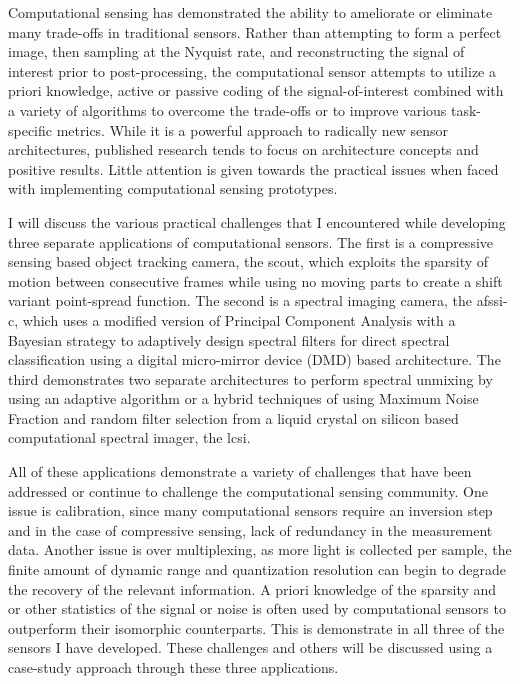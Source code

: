 Computational sensing has demonstrated the ability to ameliorate or eliminate many trade-offs in traditional sensors. Rather than attempting to form a perfect image, then sampling at the Nyquist rate, and reconstructing the signal of interest prior to post-processing, the computational sensor attempts to utilize a priori knowledge, active or passive coding of the signal-of-interest combined with a variety of algorithms to overcome the trade-offs or to improve various task-specific metrics. While it is a powerful approach to radically new sensor architectures, published research tends to focus on architecture concepts and positive results. Little attention is given towards the practical issues when faced with implementing computational sensing prototypes.

I will discuss the various practical challenges that I encountered while developing three separate applications of computational sensors. The first is a compressive sensing based object tracking camera, the \acrfull{scout}, which exploits the sparsity of motion between consecutive frames while using no moving parts to create a shift variant point-spread function. The second is a spectral imaging camera, the \acrfull{afssi-c}, which uses a modified version of Principal Component Analysis with a Bayesian strategy to adaptively design spectral filters for direct spectral classification using a digital micro-mirror device (DMD) based architecture. The third demonstrates two separate architectures to perform spectral unmixing by using an adaptive algorithm or a hybrid techniques of using Maximum Noise Fraction and random filter selection from a liquid crystal on silicon based computational spectral imager, the \acrfull{lcsi}. 

All of these applications demonstrate a variety of challenges that have been addressed or continue to challenge the computational sensing community. One issue is calibration, since many computational sensors require an inversion step and in the case of compressive sensing, lack of redundancy in the measurement data. Another issue is over multiplexing, as more light is collected per sample, the finite amount of dynamic range and quantization resolution can begin to degrade the recovery of the relevant information. A priori knowledge of the sparsity and or other statistics of the signal or noise is often used by computational sensors to outperform their isomorphic counterparts. This is demonstrate in all three of the sensors I have developed. These challenges and others will be discussed using a case-study approach through these three applications.



	

